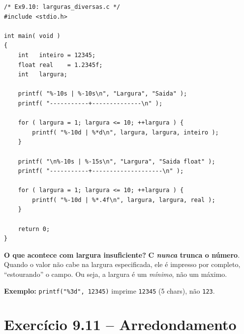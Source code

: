 \documentclass[12pt,a4paper]{article}
\begin{document}
\begin{respostabox}
\begin{lstlisting}
/* Ex9.10: larguras_diversas.c */
#include <stdio.h>

int main( void )
{
    int   inteiro = 12345;
    float real    = 1.2345f;
    int   largura;

    printf( "%-10s | %-10s\n", "Largura", "Saida" );
    printf( "-----------+--------------\n" );

    for ( largura = 1; largura <= 10; ++largura ) {
        printf( "%-10d | %*d\n", largura, largura, inteiro );
    }

    printf( "\n%-10s | %-15s\n", "Largura", "Saida float" );
    printf( "-----------+--------------------\n" );

    for ( largura = 1; largura <= 10; ++largura ) {
        printf( "%-10d | %*.4f\n", largura, largura, real );
    }

    return 0;
}
\end{lstlisting}

\textbf{O que acontece com largura insuficiente?} \textbf{C \textit{nunca} trunca o número}.
Quando o valor não cabe na largura especificada, ele é impresso por completo,
``estourando'' o campo. Ou seja, a largura é um \textit{mínimo}, não um máximo.

\textbf{Exemplo:} \texttt{printf("\%3d", 12345)} imprime \texttt{12345} (5 chars), não \texttt{123}.
\end{respostabox}

\newpage

\section{Exercício 9.11 -- Arredondamento}
\end{document}
